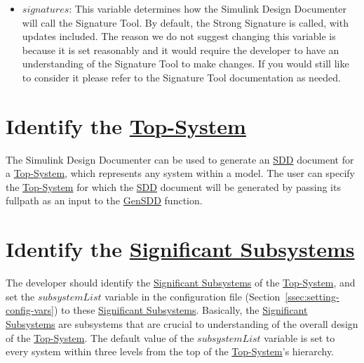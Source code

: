 \documentclass{mcscert}
\newcommand{\sigtool}{Signature Tool}
\newcommand{\sddtool}{Simulink Design Documenter}
\newcommand{\topsystemnolink}{Top-System} %
\newcommand{\topsystem}{\hyperref[def:topsystem]{\topsystemnolink{}}}
\newcommand{\sigsubsnolink}{Significant Subsystems} %
\newcommand{\sigsubs}{\hyperref[def:sigsubs]{\sigsubsnolink{}}}
\begin{document}
\begin{itemize}
		Unlike the removeInterfaceCols variable, by default this variable is set to include only the Block/Name and description columns as these tables list subsystems and the other columns are not very meaningful for subsystems. 
		The user may want to remove the description column if it is empty and they do not intend to provide descriptions. 
		Information can be added to these columns in the same way it is done for the columns in the interface sections (see Section~\ref{sec:interface-details}).
		\item $signatures$: 
		This variable determines how the \sddtool{} will call the \sigtool{}. 
		By default, the Strong Signature is called, with updates included. 
		The reason we do not suggest changing this variable is because it is set reasonably and it would require the developer to have an understanding of the \sigtool{} to make changes. 
		If you would still like to consider it please refer to the \sigtool{} documentation as needed. %
	\end{itemize}

\section{Identify the \topsystem{}}
\label{sec:decide-topsys}
The \sddtool{} can be used to generate an \hyperref[acr:sdd]{SDD} document for a \topsystem{}, which represents any \simulink{} system within a \simulink{} model. 
The user can specify the \topsystem{} for which the \hyperref[acr:sdd]{SDD} document will be generated by passing its fullpath as an input to the \hyperref[itm:call-gen-sdd]{GenSDD} function.

\section{Identify the \sigsubs{}}
\label{sec:indentify-sigsubs}
 The developer should identify the \sigsubs{} of the \topsystem{}, and set the $subsystemList$ variable in the configuration file (Section~\ref{ssec:setting-config-vars}) to these \sigsubs{}. 
 Basically, the \sigsubs{} are subsystems that	are crucial to understanding of the overall design of the \topsystem{}. 
 The default value of the $subsystemList$ variable is set to every system within three levels from the top of the \topsystem{}'s hierarchy.
 
\end{document}
